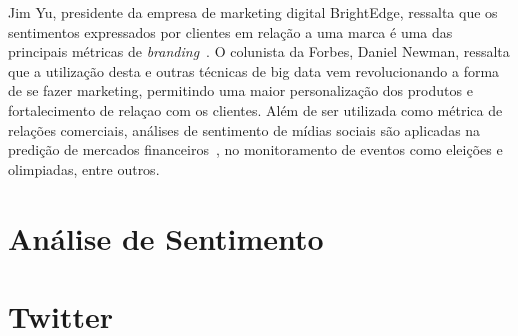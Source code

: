 Jim Yu, presidente da empresa de marketing digital BrightEdge, ressalta que os sentimentos expressados por clientes em
relação a uma marca é uma das principais métricas de \textit{branding}~\cite{marketingland}.
O colunista da Forbes, Daniel Newman, ressalta que a utilização desta e outras técnicas de big data vem revolucionando
a forma de se fazer marketing, permitindo uma maior personalização dos produtos e fortalecimento de relaçao com os
clientes.
Além de ser utilizada como métrica de relações comerciais, análises de sentimento de mídias sociais são aplicadas na
predição de mercados financeiros~\cite{bollen11}, no monitoramento de eventos como eleições e olimpiadas, entre outros.

\section{Análise de Sentimento}

\section{Twitter}
